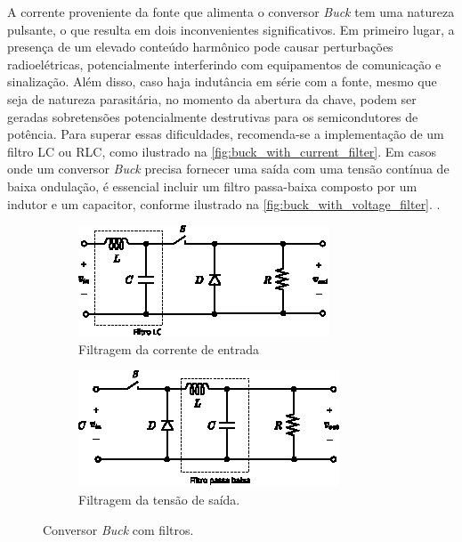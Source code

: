 A corrente proveniente da fonte que alimenta o conversor \textit{Buck} tem uma natureza pulsante, o que resulta em dois inconvenientes significativos. Em primeiro lugar, a presença de um elevado conteúdo harmônico pode causar perturbações radioelétricas, potencialmente interferindo com equipamentos de comunicação e sinalização. Além disso, caso haja indutância em série com a fonte, mesmo que seja de natureza parasitária, no momento da abertura da chave, podem ser geradas sobretensões potencialmente destrutivas para os semicondutores de potência. Para superar essas dificuldades, recomenda-se a implementação de um filtro LC ou RLC, como ilustrado na \autoref{fig:buck_with_current_filter}. Em casos onde um conversor \textit{Buck} precisa fornecer uma saída com uma tensão contínua de baixa ondulação, é essencial incluir um filtro passa-baixa composto por um indutor e um capacitor, conforme ilustrado na \autoref{fig:buck_with_voltage_filter}. \citep{martins2008}.

\begin{figure}[H]
  \captionsetup{justification=centering}
  \centering
  \begin{subfigure}[t]{0.45\textwidth}
    \centering
    \includegraphics[width=\textwidth]{figuras/buck_with_current_filter.eps}
    \caption{Filtragem da corrente de entrada}
    \label{fig:buck_with_current_filter}
  \end{subfigure}
  \hfil
  \begin{subfigure}[t]{0.45\textwidth}
    \centering
    \includegraphics[width=\textwidth]{figuras/buck_with_voltage_filter.eps}
    \caption{Filtragem da tensão de saída.}
    \label{fig:buck_with_voltage_filter}
  \end{subfigure}
  \caption{Conversor \textit{Buck} com filtros.}
\end{figure}


